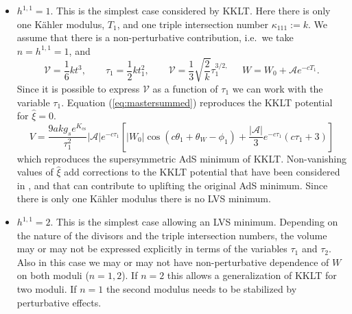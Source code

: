 \documentclass[12pt,a4wide]{article}
\def\xih{{\hat \xi}}
\def\V{\mathcal{V}}
\def\be{\begin{equation}}
\def\ee{\end{equation}}
\begin{document}
\begin{itemize}
\item $h^{1,1}=1$. This is the simplest case considered by KKLT. Here there is only one K\"ahler modulus, $T_1$, and one triple intersection number $\kappa_{111}:=k$. We assume that there is a non-perturbative contribution, i.e.~we take $n=h^{1,1}=1$, and
\be
\V=\frac16 kt^3, \qquad \tau_1=\frac12 kt_1^2, \qquad \V=\frac13 \sqrt{\frac{2}{k}}\tau_1^{3/2, \qquad }W=W_0+\mathcal{A}e^{-cT_1}.
\ee
Since it is possible to express $\V$ as a function of $\tau_1$ we can work with the variable $\tau_1$. Equation (\ref{eq:mastersummed}) reproduces   the KKLT potential for $\xih=0$. 
\be
V=\frac{9a k g_se^{K_{\text{cs}}}}{\tau_1^2}\left |\mathcal{A}\right |e^{-c\tau_1}\left [ \left | W_0 \right | \cos (c\theta_1+\theta_W -\phi_1)+\frac{|\mathcal{A}|}{3}e^{-c\tau_1}\left(c\tau_1+3\right)\right]
\ee
which reproduces the supersymmetric AdS minimum of KKLT.
Non-vanishing values of $\xih$ add corrections to the KKLT potential that have been considered in \cite{Balasubramanian:2004uy}, and that can contribute to uplifting the original AdS minimum. Since there is only one K\"ahler modulus there is no LVS minimum.

\item $h^{1,1}=2$. This is the simplest case allowing an LVS minimum. Depending on the nature of the divisors and the triple intersection numbers, the volume may or may not be expressed explicitly in terms of the variables $\tau_1$ and $\tau_2$. Also in this case we may or may not have non-perturbative dependence of $W$ on both moduli ($n=1,2$). If $n=2$ this allows a generalization of KKLT for two moduli. If $n=1$ the second modulus needs to be stabilized by perturbative effects.


\end{itemize}
\end{document}
